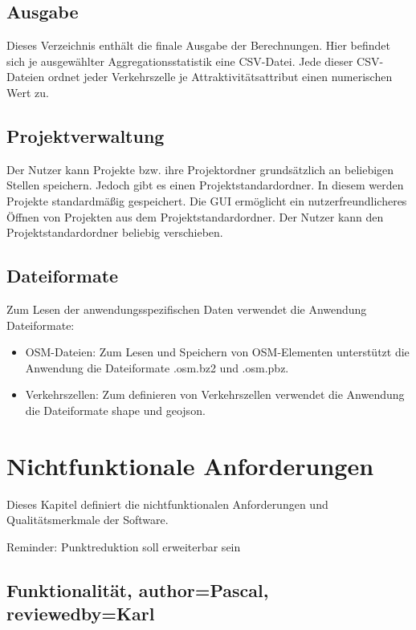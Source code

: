 \documentclass[parskip=full]{scrartcl} %
\begin{document}
\subsection*{Ausgabe}
Dieses Verzeichnis enthält die finale Ausgabe der Berechnungen. Hier befindet sich je ausgewählter Aggregationsstatistik eine CSV-Datei. Jede dieser CSV-Dateien ordnet jeder Verkehrszelle je Attraktivitätsattribut einen numerischen Wert zu.


\subsection*{Projektverwaltung}
Der Nutzer kann Projekte bzw. ihre Projektordner grundsätzlich an beliebigen Stellen speichern. Jedoch gibt es einen Projektstandardordner. In diesem werden Projekte standardmäßig gespeichert. Die GUI ermöglicht ein nutzerfreundlicheres Öffnen von Projekten aus dem Projektstandardordner. Der Nutzer kann den Projektstandardordner beliebig verschieben.

\subsection*{Dateiformate}
Zum Lesen der anwendungsspezifischen Daten verwendet die Anwendung Dateiformate:
\begin{itemize}
    \item OSM-Dateien: Zum Lesen und Speichern von OSM-Elementen unterstützt die Anwendung die Dateiformate .osm.bz2 und .osm.pbz.
    \item Verkehrszellen: Zum definieren von Verkehrszellen verwendet die Anwendung die Dateiformate shape und geojson.
\end{itemize}


\newpage







\section{Nichtfunktionale Anforderungen}

Dieses Kapitel definiert die nichtfunktionalen Anforderungen und Qualitätsmerkmale der Software.

Reminder: Punktreduktion soll erweiterbar sein



\subsection{Funktionalität, author=Pascal, reviewedby=Karl}
\end{document}
